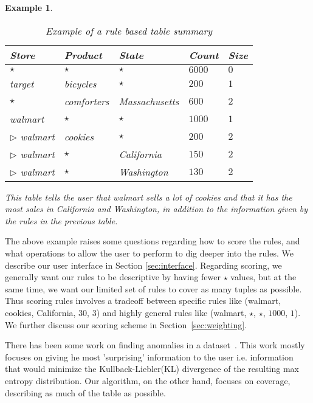 \documentclass{sig-alternate}
\newtheorem{example}[definition]{Example}
\begin{document}
\begin{example}
\begin{table}
\centering
\begin{tabular}{| l | l | l | l | l |}
\hline Store & Product & State & Count & Size \\
\hline
$\star$ & $\star$ & $\star$ & $6000$ & $0$ \\  \cline{1-5}
target & bicycles & $\star$ & $200$ & $1$ \\ \cline{1-5}
$\star$ & comforters & Massachusetts & $600$ & $2$ \\ \cline{1-5}
walmart & $\star$ & $\star$ & $1000$ & $1$ \\ \cline{2-5}
$\triangleright$ walmart & cookies & $\star$ & $200$ & $2$ \\ \cline{2-5}
$\triangleright$ walmart & $\star$ & California & $150$ & $2$ \\ \cline{2-5}
$\triangleright$ walmart & $\star$ & Washington & $130$ & $2$ \\ \hline
\end{tabular}
\caption{Example of a rule based table summary \label{table:introexample2}}
\end{table}

This table tells the user that walmart sells a lot of cookies and that it has the most sales in California and Washington, in addition to the information given by the rules in the previous table.
\end{example}

The above example raises some questions regarding how to score the rules, and what operations to allow the user to perform to dig deeper into the rules.
We describe our user interface in Section \ref{sec:interface}. Regarding scoring, we generally want our rules to be descriptive by having fewer $\star$ values, but at the same time, we want our limited set of rules to cover as many tuples as possible. Thus scoring rules involves a tradeoff between specific rules like (walmart, cookies, California, $30$, $3$) and highly general rules like (walmart, $\star$, $\star$, $1000$, $1$). We further discuss our scoring scheme in Section~\ref{sec:weighting}. 

There has been some work on finding anomalies in a dataset~\cite{Sarawagi:2001:UMA:767141.767148, Sarawagi00user-adaptiveexploration, Sarawagi98discovery-drivenexploration, DBLP:journals/pvldb/GebalyAGKS14}. This work mostly focuses on giving he most 'surprising' information to the user i.e. information that would minimize the Kullback-Liebler(KL) divergence of the resulting max entropy distribution. Our algorithm, on the other hand, focuses on coverage, describing as much of the table as possible. 
\end{document}
